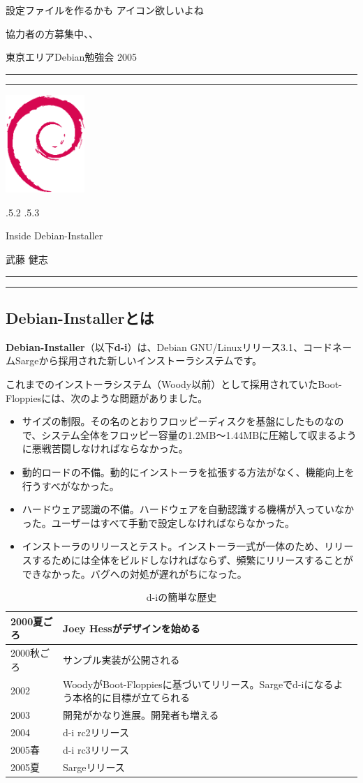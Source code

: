 \documentclass[mingoth]{jsarticle}
\makeatletter
\renewcommand{\section}{\@startsection{section}{1}{\z@}%
    {\Cvs \@plus.5\Cdp \@minus.2\Cdp}%
    {.5\Cvs \@plus.3\Cdp}%
    {\normalfont\Large\headfont\raggedright\centering}} %
\newcommand{\dancersection}[2]{%
\newpage
東京エリアDebian勉強会 2005
\hrule
\vspace{0.5mm}
\hrule
\hfill{}\includegraphics[width=3cm]{image200502/openlogo-nd.eps}\\
\vspace{-4cm}
\begin{center}
  \section{#1}
\end{center}
\hfill{}#2\hspace{3cm}\space\\
\hrule
\hrule
\vspace{1cm}
}
\makeatother
\begin{document}
     設定ファイルを作るかも
     アイコン欲しいよね

   協力者の方募集中、、



\dancersection{Inside Debian-Installer}{武藤 健志}
\label{sec:inst}


\subsection{Debian-Installerとは}
\label{sec:whatd-i}

\textbf{Debian-Installer}（以下\textbf{d-i}）は、Debian GNU/Linuxリリース3.1、コードネームSargeから採用された新しいインストーラシステムです。

これまでのインストーラシステム（Woody以前）として採用されていたBoot-Floppiesには、次のような問題がありました。

\begin{itemize}
\item サイズの制限。その名のとおりフロッピーディスクを基盤にしたものなので、システム全体をフロッピー容量の1.2MB〜1.44MBに圧縮して収まるように悪戦苦闘しなければならなかった。
\item 動的ロードの不備。動的にインストーラを拡張する方法がなく、機能向上を行うすべがなかった。
\item ハードウェア認識の不備。ハードウェアを自動認識する機構が入っていなかった。ユーザーはすべて手動で設定しなければならなかった。
\item インストーラのリリースとテスト。インストーラ一式が一体のため、リリースするためには全体をビルドしなければならず、頻繁にリリースすることができなかった。バグへの対処が遅れがちになった。
\end{itemize}

\begin{table}[htbp]
  \begin{tabular}[htbp]{|l|p{10cm}|}\hline
    2000夏ごろ&Joey Hessがデザインを始める\\ \hline
    2000秋ごろ&サンプル実装が公開される\\ \hline
    2002&WoodyがBoot-Floppiesに基づいてリリース。Sargeでd-iになるよう本格的に目標が立てられる\\ \hline
    2003&開発がかなり進展。開発者も増える\\ \hline
    2004&d-i rc2リリース\\ \hline
    2005春&d-i rc3リリース\\ \hline
    2005夏&Sargeリリース\\ \hline
  \end{tabular}
  \caption{d-iの簡単な歴史}
  \label{tab:history}
\end{table}
\end{document}
